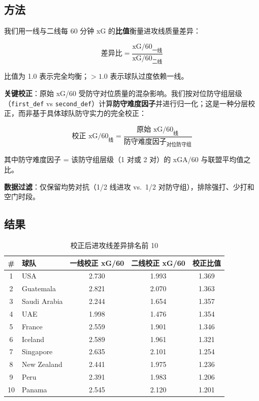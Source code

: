 \documentclass[11pt, a4paper]{article}
\begin{document}
\subsection{方法}

我们用一线与二线每 60 分钟 xG 的\textbf{比值}衡量进攻线质量差异：

\begin{equation}
\text{差异比} = \frac{\text{xG/60}_{\text{一线}}}{\text{xG/60}_{\text{二线}}}
\end{equation}

比值为 1.0 表示完全均衡；$> 1.0$ 表示球队过度依赖一线。

\textbf{关键校正}：原始 xG/60 受防守对位质量的混杂影响。我们按对位防守组层级（\texttt{first\_def} vs \texttt{second\_def}）计算\textbf{防守难度因子}并进行归一化；这是一种分层校正，而非基于具体球队防守实力的完全校正：

\begin{equation}
\text{校正 xG/60}_{\text{线}} = \frac{\text{原始 xG/60}_{\text{线}}}{\text{防守难度因子}_{\text{对位防守组}}}
\end{equation}

其中防守难度因子 = 该防守组层级（1 对或 2 对）的 xGA/60 与联盟平均值之比。

\textbf{数据过滤}：仅保留均势对抗（1/2 线进攻 vs.\ 1/2 对防守组），排除强打、少打和空门时段。

\subsection{结果}

\begin{table}[H]
\centering
\caption{校正后进攻线差异排名前 10}
\label{tab:disparity}
\begin{tabular}{clccc}
\toprule
\textbf{\#} & \textbf{球队} & \textbf{一线校正 xG/60} & \textbf{二线校正 xG/60} & \textbf{校正比值} \\
\midrule
1  & USA          & 2.730 & 1.993 & 1.369 \\
2  & Guatemala    & 2.821 & 2.070 & 1.363 \\
3  & Saudi Arabia & 2.244 & 1.654 & 1.357 \\
4  & UAE          & 1.998 & 1.476 & 1.354 \\
5  & France       & 2.559 & 1.901 & 1.346 \\
6  & Iceland      & 2.589 & 1.961 & 1.321 \\
7  & Singapore    & 2.635 & 2.101 & 1.254 \\
8  & New Zealand  & 2.441 & 1.975 & 1.236 \\
9  & Peru         & 2.391 & 1.983 & 1.206 \\
10 & Panama       & 2.545 & 2.120 & 1.201 \\
\bottomrule
\end{tabular}
\end{table}
\end{document}
